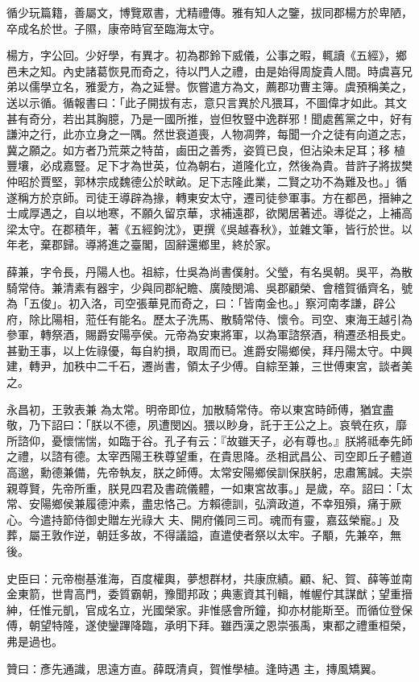 \begin{pinyinscope}
 循少玩篇籍，善屬文，博覽眾書，尤精禮傳。雅有知人之鑒，拔同郡楊方於卑陋，卒成名於世。子隰，康帝時官至臨海太守。



 楊方，字公回。少好學，有異才。初為郡鈴下威儀，公事之暇，輒讀《五經》，鄉邑未之知。內史諸葛恢見而奇之，待以門人之禮，由是始得周旋貴人間。時虞喜兄弟以儒學立名，雅愛方，為之延譽。恢嘗遣方為文，薦郡功曹主簿。虞預稱美之，送以示循。循報書曰：「此子開拔有志，意只言異於凡猥耳，不圖偉才如此。其文甚有奇分，若出其胸臆，乃是一國所推，豈但牧豎中逸群邪！聞處舊黨之中，好有謙沖之行，此亦立身之一隅。然世衰道喪，人物凋弊，每聞一介之徒有向道之志，冀之願之。如方者乃荒萊之特苗，鹵田之善秀，姿質已良，但沾染未足耳；移
 植豐壤，必成嘉豎。足下才為世英，位為朝右，道隆化立，然後為貴。昔許子將拔樊仲昭於賈堅，郭林宗成魏德公於畎畝。足下志隆此業，二賢之功不為難及也。」循遂稱方於京師。司徒王導辟為掾，轉東安太守，遷司徒參軍事。方在都邑，搢紳之士咸厚遇之，自以地寒，不願久留京華，求補遠郡，欲閑居著述。導從之，上補高梁太守。在郡積年，著《五經鉤沈》，更撰《吳越春秋》，並雜文筆，皆行於世。以年老，棄郡歸。導將進之臺閣，固辭還鄉里，終於家。



 薛兼，字令長，丹陽人也。祖綜，仕吳為尚書僕射。父瑩，有名吳朝。吳平，為散騎常侍。兼清素有器宇，少與同郡紀瞻、廣陵閔鴻、吳郡顧榮、會稽賀循齊名，號為「五俊」。初入洛，司空張華見而奇之，曰：「皆南金也。」察河南孝謙，辟公府，除比陽相，蒞任有能名。歷太子洗馬、散騎常侍、懷令。司空、東海王越引為參軍，轉祭酒，賜爵安陽亭侯。元帝為安東將軍，以為軍諮祭酒，稍遷丞相長史。甚勤王事，以上佐祿優，每自約損，取周而已。進爵安陽鄉侯，拜丹陽太守。中興建，轉尹，加秩中二千石，遷尚書，領太子少傅。自綜至兼，三世傅東宮，談者美之。



 永昌初，王敦表兼
 為太常。明帝即位，加散騎常侍。帝以東宮時師傅，猶宜盡敬，乃下詔曰：「朕以不德，夙遭閔凶。猥以眇身，託于王公之上。哀煢在疚，靡所諮仰，憂懷惴惴，如臨于谷。孔子有云：『故雖天子，必有尊也。』朕將祗奉先師之禮，以諮有德。太宰西陽王秩尊望重，在貴思降。丞相武昌公、司空即丘子體道高邈，勳德兼備，先帝執友，朕之師傅。太常安陽鄉侯訓保朕躬，忠肅篤誠。夫崇親尊賢，先帝所重，朕見四君及書疏儀體，一如東宮故事。」是歲，卒。詔曰：「太常、安陽鄉侯兼履德沖素，盡忠恪己。方賴德訓，弘濟政道，不幸殂殞，痛于厥心。今遣持節侍御史贈左光祿大
 夫、開府儀同三司。魂而有靈，嘉茲榮寵。」及葬，屬王敦作逆，朝廷多故，不得議謚，直遣使者祭以太牢。子顒，先兼卒，無後。



 史臣曰：元帝樹基淮海，百度權輿，夢想群材，共康庶績。顧、紀、賀、薛等並南金東箭，世胄高門，委質霸朝，豫聞邦政；典憲資其刊輯，帷幄佇其謀猷；望重搢紳，任惟元凱，官成名立，光國榮家。非惟感會所鐘，抑亦材能斯至。而循位登保傅，朝望特隆，遂使鑾蹕降臨，承明下拜。雖西漢之恩崇張禹，東都之禮重桓榮，弗是過也。



 贊曰：彥先通識，思遠方直。薛既清貞，賀惟學植。逢時遇
 主，摶風矯翼。



\end{pinyinscope}
